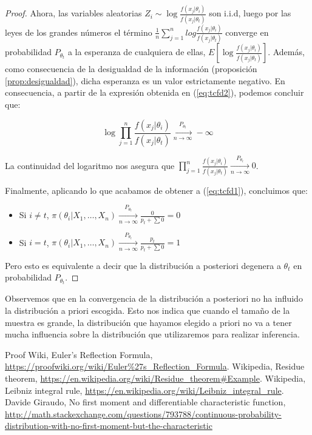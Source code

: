 \documentclass{article}
\begin{document}
\begin{proof}
	Ahora, las variables aleatorias $Z_i \sim \log{\frac{f(x_j|\theta_i)}{f(x_j|\theta_t)}}$ son i.i.d, luego por las leyes de los grandes números el término $\frac{1}{n}\sum_{j=1}^{n}{log{\frac{f(x_j|\theta_i)}{f(x_j|\theta_t)}}}$ converge en probabilidad $P_{\theta_t}$ a la esperanza de cualquiera de ellas, $E\left[\log{\frac{f(x_j|\theta_i)}{f(x_j|\theta_t)}}\right]$. Además, como consecuencia de la desigualdad de la información (proposición \ref{prop:desigualdad}), dicha esperanza es un valor estrictamente negativo. En consecuencia, a partir de la expresión obtenida en (\ref{eq:tcfd2}), podemos concluir que:

	\[\log{\prod_{j=1}^n{\frac{f(x_j|\theta_i)}{f(x_j|\theta_t)}}} \xrightarrow[n\to\infty]{P_{\theta_t}} -\infty\]

	La continuidad del logaritmo nos asegura que $\prod_{j=1}^n{\frac{f(x_j|\theta_i)}{f(x_j|\theta_t)}} \xrightarrow[n\to\infty]{P_{\theta_t}} 0$.

	Finalmente, aplicando lo que acabamos de obtener a (\ref{eq:tcfd1}), concluimos que:

	\begin{itemize}
		\item Si $i \ne t$, $\pi(\theta_i|X_1,\dots,X_n) \xrightarrow[n\to\infty]{P_{\theta_t}} \frac{0}{p_t+\sum{0}} = 0$
		\item Si $i = t$, $\pi(\theta_i|X_1,\dots,X_n) \xrightarrow[n\to\infty]{P_{\theta_t}} \frac{p_t}{p_t+\sum{0}} = 1$
	\end{itemize}

	Pero esto es equivalente a decir que la distribución a posteriori degenera a $\theta_t$ en probabilidad $P_{\theta_t}$.
\end{proof}

\begin{remark}
	Observemos que en la convergencia de la distribución a posteriori no ha influido la distribución a priori escogida. Esto nos indica que cuando el tamaño de la muestra es grande, la distribución que hayamos elegido a priori no va a tener mucha influencia sobre la distribución que utilizaremos para realizar inferencia.
\end{remark}

\begin{thebibliography}{99}
 Proof Wiki, Euler's Reflection Formula, \url{https://proofwiki.org/wiki/Euler%27s_Reflection_Formula}.
 Wikipedia, Residue theorem, \url{https://en.wikipedia.org/wiki/Residue_theorem#Example}.
 Wikipedia, Leibniz integral rule, \url{https://en.wikipedia.org/wiki/Leibniz_integral_rule}.
 Davide Giraudo, No first moment and differentiable characteristic function, \url{http://math.stackexchange.com/questions/793788/continuous-probability-distribution-with-no-first-moment-but-the-characteristic}
\end{thebibliography}
\end{document}
